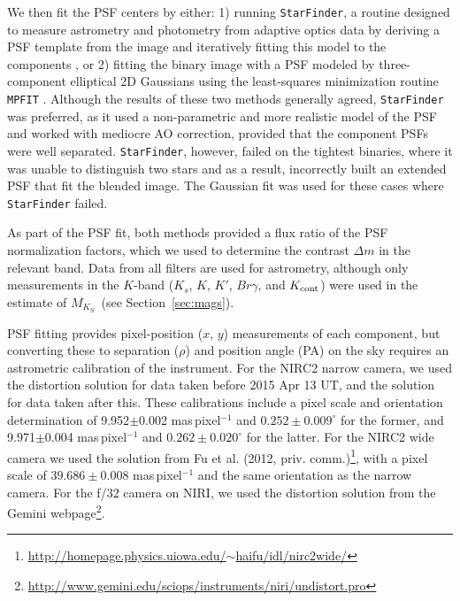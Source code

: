 \documentclass[twocolumn]{aastex62}
\newcommand{\mks}{$M_{K_S}$}
\begin{document}
We then fit the PSF centers by either: 1) running {\tt StarFinder}, a routine designed to measure astrometry and photometry from adaptive optics data by deriving a PSF template from the image and iteratively fitting this model to the components \citep[for more details, see][]{2000A&AS..147..335D}, or 2) fitting the binary image with a PSF modeled by three-component elliptical 2D Gaussians using the least-squares minimization routine {\tt MPFIT} \citep{Markwart2009}. Although the results of these two methods generally agreed, {\tt StarFinder} was preferred, as it used a non-parametric and more realistic model of the PSF and worked with mediocre AO correction, provided that the component PSFs were well separated. {\tt StarFinder}, however, failed on the tightest binaries, where it was unable to distinguish two stars and as a result, incorrectly built an extended PSF that fit the blended image. The Gaussian fit was used for these cases where {\tt StarFinder} failed. 

As part of the PSF fit, both methods provided a flux ratio of the PSF normalization factors, which we used to determine the contrast $\Delta m$ in the relevant band. Data from all filters are used for astrometry, although only measurements in the $K$-band ($K_s$, $K$, $K'$, $Br\gamma$, and $K_{\rm{cont}}$) were used in the estimate of \mks\ (see Section~\ref{sec:mags}).

PSF fitting provides pixel-position ($x$, $y$) measurements of each component, but converting these to separation ($\rho$) and position angle (PA) on the sky requires an astrometric calibration of the instrument. For the NIRC2 narrow camera, we used the \citet{Yelda2010} distortion solution for data taken before 2015 Apr 13 UT, and the \citet{2016PASP..128i5004S} solution for data taken after this. These calibrations include a pixel scale and orientation determination of 9.952$\pm$0.002 mas\,pixel$^{-1}$ and $0.252\pm0.009^{\circ}$ for the former, and 9.971$\pm$0.004 mas\,pixel$^{-1}$ and $0.262\pm0.020^{\circ}$ for the latter. For the NIRC2 wide camera we used the solution from Fu et al. (2012, priv. comm.)\footnote{\href{http://homepage.physics.uiowa.edu/~haifu/idl/nirc2wide/}{http://homepage.physics.uiowa.edu/$\sim$haifu/idl/nirc2wide/}}, with a pixel scale of $39.686\pm0.008$ mas\,pixel$^{-1}$ and the same orientation as the narrow camera. For the f/32 camera on NIRI, we used the distortion solution from the Gemini webpage\footnote{\href{http://www.gemini.edu/sciops/instruments/niri/undistort.pro}{http://www.gemini.edu/sciops/instruments/niri/undistort.pro}}. 
\end{document}
